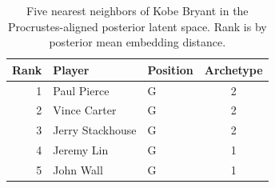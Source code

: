 \begin{table}[htbp]
  \centering\small
  \begin{tabular}{rllc}
    \toprule
    Rank & Player & Position & Archetype \\
    \midrule
    1 & Paul Pierce & G & 2 \\
    2 & Vince Carter & G & 2 \\
    3 & Jerry Stackhouse & G & 2 \\
    4 & Jeremy Lin & G & 1 \\
    5 & John Wall & G & 1 \\
    \bottomrule
  \end{tabular}
  \caption{Five nearest neighbors of Kobe Bryant in the Procrustes-aligned posterior latent space. Rank is by posterior mean embedding distance.}
  \label{tab:Kobe_Bryant_neighbors}
\end{table}

